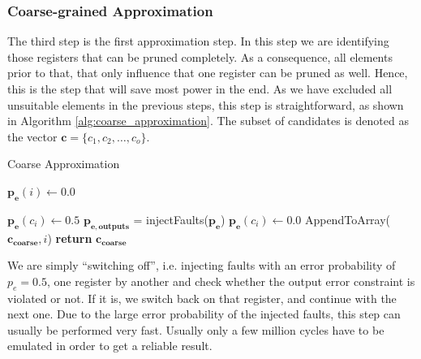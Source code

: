 \documentclass[conference]{IEEEtran}
\begin{document}
\subsubsection{Coarse-grained Approximation}
The third step is the first approximation step. In this step we are identifying those registers that can be pruned completely. As a consequence, all elements prior to that, that only influence that one register can be pruned as well. Hence, this is the step that will save most power in the end. As we have excluded all unsuitable elements in the previous steps, this step is straightforward, as shown in Algorithm \ref{alg:coarse_approximation}. The subset of candidates is denoted as the vector $\mathbf{c} = \{c_1,c_2,\ldots,c_{o}\}$.
\begin{algorithm}[h]
  \caption{Coarse Approximation}\label{alg:coarse_approximation}
  \begin{algorithmic}[1]
    \State $\mathbf{p_e}(i) \gets 0.0$
    \EndFor

    \State $\mathbf{p_e}(c_i) \gets 0.5$
    \State $\mathbf{p_{e,outputs}}$ = injectFaults($\mathbf{p_e}$)
    \State $\mathbf{p_e}(c_i) \gets 0.0$
    \Else
    \State AppendToArray($\mathbf{c_{coarse}},i$)
    \EndIf
    \EndFor
    \State \textbf{return} $\mathbf{c_{coarse}}$ 
    \EndProcedure
  \end{algorithmic}
\end{algorithm}
We are simply ``switching off'', i.e. injecting faults with an error probability of $p_e=0.5$, one register by another and check whether the output error constraint is violated or not. If it is, we switch back on that register, and continue with the next one. Due to the large error probability of the injected faults, this step can usually be performed very fast. Usually only a few million cycles have to be emulated in order to get a reliable result. 
\end{document}
